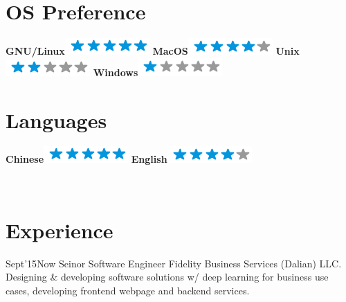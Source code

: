 \documentclass[]{lubricy-cv}
\begin{document}
\begin{aside}
  \section{OS Preference}
    \textbf{GNU/Linux}\includegraphics[scale=0.40]{img/5stars.png}
    \textbf{MacOS}\includegraphics[scale=0.40]{img/4stars.png}
    \textbf{Unix}\includegraphics[scale=0.40]{img/2stars.png}
    \textbf{Windows}\includegraphics[scale=0.40]{img/1stars.png}
    ~
  \section{Languages}
    \textbf{Chinese}\includegraphics[scale=0.40]{img/5stars.png}
    \textbf{English}\includegraphics[scale=0.40]{img/4stars.png}
    ~
\end{aside}
~
\section{Experience}
\begin{entrylist}
  \entry
    {Sept'15}{Now}
    {Seinor Software Engineer}
    {Fidelity Business Services (Dalian) LLC.}
    {Designing \& developing software solutions w/ deep learning for business use cases,
      developing frontend webpage and backend services. }
    {}
\end{entrylist}
~
\end{document}
